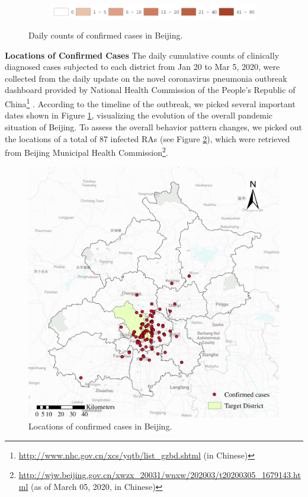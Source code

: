 \documentclass[ijgi,submit,moreauthors,pdftex]{Definitions/mdpi}
\begin{document}
\begin{figure}[ht]
    \vspace{6pt}
    \begin{subfigure}{0.7\textwidth}
        \includegraphics[width=\textwidth]{Figures/Fig2legend-eps-converted-to.pdf}
    \end{subfigure}
    \caption{Daily counts of confirmed cases in Beijing.}
    \label{fig:number_of_confirmed_cases}
\end{figure}

\textbf{Locations of Confirmed Cases}
The daily cumulative counts of clinically diagnosed cases subjected to each district from Jan 20 to Mar 5, 2020, were collected from the daily update on the novel coronavirus pneumonia outbreak dashboard provided by National Health Commission of the People's Republic of China\footnote{\url{http://www.nhc.gov.cn/xcs/yqtb/list_gzbd.shtml} (in Chinese)} .
According to the timeline \cite{li2020early} of the outbreak, we picked several important dates shown in Figure \ref{fig:number_of_confirmed_cases}, visualizing the evolution of the overall pandemic situation of Beijing.
To assess the overall behavior pattern changes, we picked out the locations of a total of 87 infected RAs (see Figure \ref{fig:locations_of_confirmed_cases}), which were retrieved from Beijing Municipal Health Commission\footnote{\url{http://wjw.beijing.gov.cn/xwzx_20031/wnxw/202003/t20200305_1679143.html} (as of March 05, 2020, in Chinese)}.

\begin{figure}[ht]
    \centering
    \includegraphics[width=.5\textwidth]{Figures/Plot_location_confirmed_cases-eps-converted-to.pdf}
    \caption{Locations of confirmed cases in Beijing.}
    \label{fig:locations_of_confirmed_cases}
\end{figure}
\end{document}
